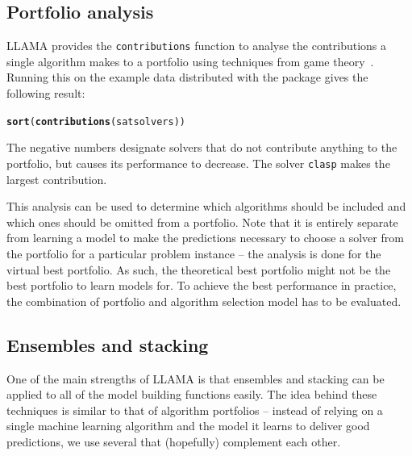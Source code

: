 \documentclass{article}\usepackage[]{graphicx}\usepackage[]{color}
\makeatletter
\newcommand{\hlstd}[1]{\textcolor[rgb]{0.345,0.345,0.345}{#1}}%
\newcommand{\hlkwd}[1]{\textcolor[rgb]{0.737,0.353,0.396}{\textbf{#1}}}%
\newenvironment{kframe}{%
 \def\at@end@of@kframe{}%
 \ifinner\ifhmode%
  \def\at@end@of@kframe{\end{minipage}}%
  \begin{minipage}{\columnwidth}%
 \fi\fi%
 \def\FrameCommand##1{\hskip\@totalleftmargin \hskip-\fboxsep
 \colorbox{shadecolor}{##1}\hskip-\fboxsep
     \hskip-\linewidth \hskip-\@totalleftmargin \hskip\columnwidth}%
 \MakeFramed {\advance\hsize-\width
   \@totalleftmargin\z@ \linewidth\hsize
   \@setminipage}}%
 {\par\unskip\endMakeFramed%
 \at@end@of@kframe}
\newenvironment{knitrout}{}{} %
\makeatother
\begin{document}
\subsection{Portfolio analysis}

LLAMA provides the \lstinline{contributions} function to analyse the
contributions a single algorithm makes to a portfolio using techniques from game
theory~\cite{rahwan_game_2013}. Running this on the example data distributed
with the package gives the following result:

\begin{knitrout}
\color{fgcolor}\begin{kframe}
\begin{alltt}
\hlkwd{sort}\hlstd{(}\hlkwd{contributions}\hlstd{(satsolvers))}
\end{alltt}


{\ttfamily\noindent\bfseries\color{errorcolor}{\#\# Error in .jfindClass(as.character(class)): class not found}}\end{kframe}
\end{knitrout}

The negative numbers designate solvers that do not contribute anything to the
portfolio, but causes its performance to decrease. The solver \lstinline{clasp}
makes the largest contribution.

This analysis can be used to determine which algorithms should be included and
which ones should be omitted from a portfolio. Note that it is entirely separate
from learning a model to make the predictions necessary to choose a solver from
the portfolio for a particular problem instance -- the analysis is done for the
virtual best portfolio. As such, the theoretical best portfolio might not be the
best portfolio to learn models for. To achieve the best performance in practice,
the combination of portfolio and algorithm selection model has to be evaluated.

\subsection{Ensembles and stacking}

One of the main strengths of LLAMA is that ensembles and stacking can be
applied to all of the model building functions easily. The idea behind
these techniques is similar to that of algorithm portfolios -- instead of
relying on a single machine learning algorithm and the model it learns to
deliver good predictions, we use several that (hopefully) complement each other.
\end{document}
